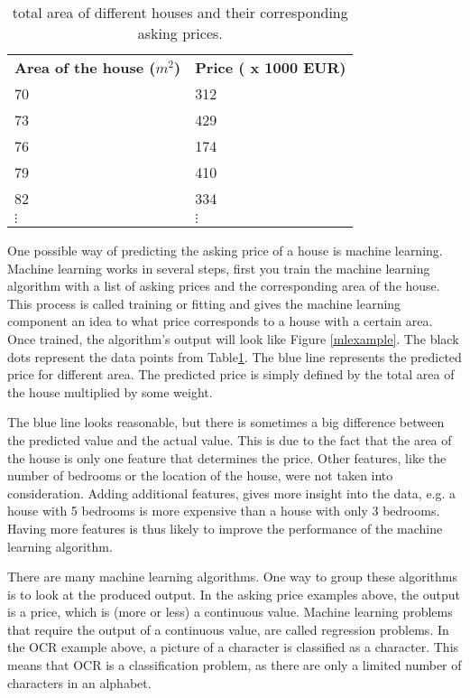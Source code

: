 \begin{table}[H]
\centering
\begin{tabular}{ll}
\textbf{Area of the house ($m^{2}$)} & \textbf{Price ( x 1000 EUR)} \\
70                              & 312                          \\
73                              & 429                          \\
76                              & 174                          \\
79                              & 410                          \\
82                              & 334                          \\
$\vdots$                        & $\vdots$
\end{tabular}
\caption{total area of different houses and their corresponding asking prices.\label{mlexampleTable}}
\end{table}

One possible way of predicting the asking price of a house is machine learning. Machine learning works in several steps, first you train the machine learning algorithm with a list of asking prices and the corresponding area of the house. This process is called training or fitting and gives the machine learning component an idea to what price corresponds to a house with a certain area. Once trained, the algorithm's output will look like Figure \ref{mlexample}. The black dots represent the data points from Table\ref{mlexampleTable}. The blue line represents the predicted price for different area. The predicted price is simply defined by the total area of the house multiplied by some weight.


The blue line looks reasonable, but there is sometimes a big difference between the predicted value and the actual value. This is due to the fact that the area of the house is only one feature that determines the price. Other features, like the number of bedrooms or the location of the house, were not taken into consideration. Adding additional features, gives more insight into the data, e.g. a house with 5 bedrooms is more expensive than a house with only 3 bedrooms. Having more features is thus likely to improve the performance of the machine learning algorithm.

\npar

There are many machine learning algorithms. One way to group these algorithms is to look at the produced output. In the asking price examples above, the output is a price, which is (more or less) a continuous value. Machine learning problems that require the output of a continuous value, are called regression problems\citep{prml}. In the OCR example above, a picture of a character is classified as a character. This means that OCR is a classification problem, as there are only a limited number of characters in an alphabet\citep{prml}.

